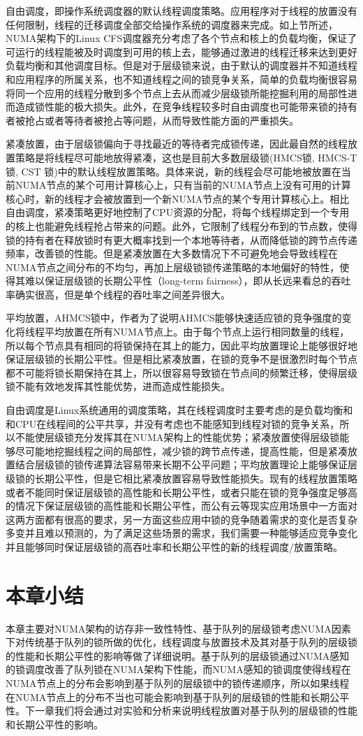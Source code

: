 自由调度，即操作系统调度器的默认线程调度策略。应用程序对于线程的放置没有任何限制，线程的迁移调度全部交给操作系统的调度器来完成。如上节所述，NUMA架构下的Linux CFS调度器充分考虑了各个节点和核上的负载均衡，保证了可运行的线程能被及时调度到可用的核上去，能够通过激进的线程迁移来达到更好负载均衡和其他调度目标\cite{guiroux2016multicore}。但是对于层级锁来说，由于默认的调度器并不知道线程和应用程序的所属关系，也不知道线程之间的锁竞争关系，简单的负载均衡很容易将同一个应用的线程分散到多个节点上去从而减少层级锁所能挖掘利用的局部性进而造成锁性能的极大损失。此外，在竞争线程较多时自由调度也可能带来锁的持有者被抢占或者等待者被抢占等问题，从而导致性能方面的严重损失。

紧凑放置，由于层级锁偏向于寻找最近的等待者完成锁传递，因此最自然的线程放置策略是将线程尽可能地放得紧凑，这也是目前大多数层级锁(HMCS锁\cite{chabbi2015high}, HMCS-T锁\cite{chabbi2017efficient}, CST 锁\cite{kashyap2017scalable})中的默认线程放置策略。具体来说，新的线程会尽可能地被放置在当前NUMA节点的某个可用计算核心上，只有当前的NUMA节点上没有可用的计算核心时，新的线程才会被放置到一个新NUMA节点的某个专用计算核心上。相比自由调度，紧凑策略更好地控制了CPU资源的分配，将每个线程绑定到一个专用的核上也能避免线程抢占带来的问题。此外，它限制了线程分布到的节点数，使得锁的持有者在释放锁时有更大概率找到一个本地等待者，从而降低锁的跨节点传递频率，改善锁的性能。但是紧凑放置在大多数情况下不可避免地会导致线程在NUMA节点之间分布的不均匀，再加上层级锁锁传递策略的本地偏好的特性，使得其难以保证层级锁的长期公平性（long-term fairness），即从长远来看总的吞吐率确实很高，但是单个线程的吞吐率之间差异很大。

平均放置，AHMCS\cite{chabbi2016contention}锁中，作者为了说明AHMCS能够快速适应锁的竞争强度的变化将线程平均放置在所有NUMA节点上。由于每个节点上运行相同数量的线程，所以每个节点具有相同的将锁保持在其上的能力，因此平均放置理论上能够很好地保证层级锁的长期公平性。但是相比紧凑放置，在锁的竞争不是很激烈时每个节点都不可能将锁长期保持在其上，所以很容易导致锁在节点间的频繁迁移，使得层级锁不能有效地发挥其性能优势，进而造成性能损失。


自由调度是Linux系统通用的调度策略，其在线程调度时主要考虑的是负载均衡和和CPU在线程间的公平共享，并没有考虑也不能感知到线程对锁的竞争关系，所以不能使层级锁充分发挥其在NUMA架构上的性能优势；紧凑放置使得层级锁能够尽可能地挖掘线程之间的局部性，减少锁的跨节点传递，提高性能，但是紧凑放置结合层级锁的锁传递算法容易带来长期不公平问题；平均放置理论上能够保证层级锁的长期公平性，但是它相比紧凑放置容易导致性能损失。现有的线程放置策略或者不能同时保证层级锁的高性能和长期公平性，或者只能在锁的竞争强度足够高的情况下保证层级锁的高性能和长期公平性，而公有云等现实应用场景中一方面对这两方面都有很高的要求，另一方面这些应用中锁的竞争随着需求的变化是否复杂多变并且难以预测的\cite{chabbi2016contention}\cite{johnson2010decoupling}，为了满足这些场景的需求，我们需要一种能够适应竞争变化并且能够同时保证层级锁的高吞吐率和长期公平性的新的线程调度/放置策略。

\section{本章小结}
本章主要对NUMA架构的访存非一致性特性、基于队列的层级锁考虑NUMA因素下对传统基于队列的锁所做的优化，线程调度与放置技术及其对基于队列的层级锁的性能和长期公平性的影响等做了详细说明。基于队列的层级锁通过NUMA感知的锁调度改善了队列锁在NUMA架构下性能，而NUMA感知的锁调度使得线程在NUMA节点上的分布会影响到基于队列的层级锁中的锁传递顺序，所以如果线程在NUMA节点上的分布不当也可能会影响到基于队列的层级锁的性能和长期公平性。下一章我们将会通过对实验和分析来说明线程放置对基于队列的层级锁的性能和长期公平性的影响。